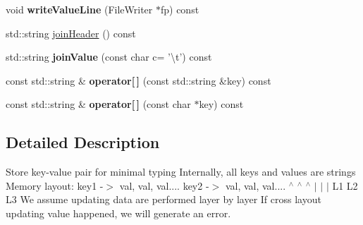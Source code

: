 \begin{DoxyCompactItemize}
\item 
\hypertarget{classResult_a7dde3225ef12295468dcd94e536fd3d5}{void {\bfseries write\-Value\-Line} (File\-Writer $\ast$fp) const }\label{classResult_a7dde3225ef12295468dcd94e536fd3d5}

\item 
std\-::string \hyperlink{classResult_a3fb648ffdefe96e7ffc00a2a294d89f3}{join\-Header} () const 
\item 
\hypertarget{classResult_ad4e01fb1cbc1b2251037f3616e3202bc}{std\-::string {\bfseries join\-Value} (const char c= '\textbackslash{}t') const }\label{classResult_ad4e01fb1cbc1b2251037f3616e3202bc}

\item 
\hypertarget{classResult_a455408961e4ec9b7c7a162f2695842a2}{const std\-::string \& {\bfseries operator\mbox{[}$\,$\mbox{]}} (const std\-::string \&key) const }\label{classResult_a455408961e4ec9b7c7a162f2695842a2}

\item 
\hypertarget{classResult_a2302fdfaabc24530943795ae7c488ae4}{const std\-::string \& {\bfseries operator\mbox{[}$\,$\mbox{]}} (const char $\ast$key) const }\label{classResult_a2302fdfaabc24530943795ae7c488ae4}

\end{DoxyCompactItemize}


\subsection{Detailed Description}
Store key-\/value pair for minimal typing Internally, all keys and values are strings Memory layout\-: key1 -\/$>$ val, val, val.... key2 -\/$>$ val, val, val.... $^\wedge$ $^\wedge$ $^\wedge$ $|$ $|$ $|$ L1 L2 L3 We assume updating data are performed layer by layer If cross layout updating value happened, we will generate an error. 

